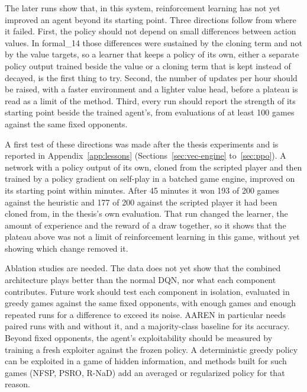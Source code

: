The later runs show that, in this system, reinforcement learning has not yet improved an agent beyond its starting point. Three directions follow from where it failed. First, the policy should not depend on small differences between action values. In formal\_14 those differences were sustained by the cloning term and not by the value targets, so a learner that keeps a policy of its own, either a separate policy output trained beside the value or a cloning term that is kept instead of decayed, is the first thing to try. Second, the number of updates per hour should be raised, with a faster environment and a lighter value head, before a plateau is read as a limit of the method. Third, every run should report the strength of its starting point beside the trained agent's, from evaluations of at least 100 games against the same fixed opponents.

A first test of these directions was made after the thesis experiments and is reported in Appendix~\ref{app:lessons} (Sections~\ref{sec:vec-engine} to~\ref{sec:ppo}). A network with a policy output of its own, cloned from the scripted player and then trained by a policy gradient on self-play in a batched game engine, improved on its starting point within minutes. After 45 minutes it won 193 of 200 games against the heuristic and 177 of 200 against the scripted player it had been cloned from, in the thesis's own evaluation. That run changed the learner, the amount of experience and the reward of a draw together, so it shows that the plateau above was not a limit of reinforcement learning in this game, without yet showing which change removed it.

Ablation studies are needed. The data does not yet show that the combined architecture plays better than the normal DQN, nor what each component contributes. Future work should test each component in isolation, evaluated in greedy games against the same fixed opponents, with enough games and enough repeated runs for a difference to exceed its noise. AAREN in particular needs paired runs with and without it, and a majority-class baseline for its accuracy. Beyond fixed opponents, the agent's exploitability should be measured by training a fresh exploiter against the frozen policy. A deterministic greedy policy can be exploited in a game of hidden information, and methods built for such games (NFSP, PSRO, R-NaD) add an averaged or regularized policy for that reason.
